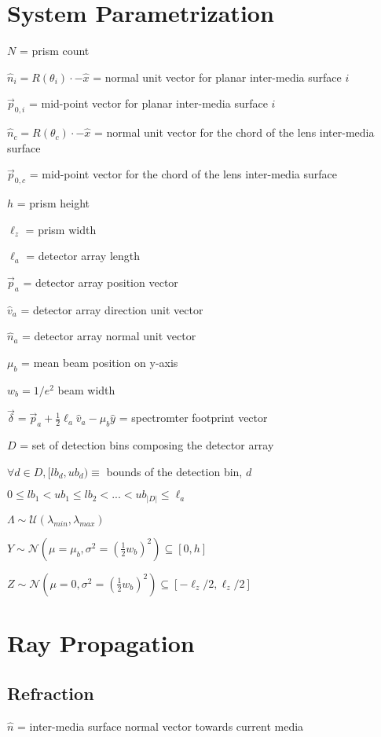 \documentclass{article}
\begin{document}
\section{System Parametrization}\label{sec:system-parametrization}
$N$ = prism count

$\hat{n}_i = R(\theta_i) \cdot -\hat{x}$ = normal unit vector for planar inter-media surface $i$

$\vec{p}_{0, i}$ = mid-point vector for planar inter-media surface $i$

$\hat{n}_c = R(\theta_c) \cdot -\hat{x}$ = normal unit vector for the chord of the lens inter-media surface

$\vec{p}_{0, c}$ = mid-point vector for the chord of the lens inter-media surface

$h$ = prism height

$\ell_z$  = prism width

$\ell_a$  = detector array length

$\vec{p}_a$ = detector array position vector

$\hat{v}_a$ = detector array direction unit vector

$\hat{n}_a$ = detector array normal unit vector

$\mu_b$ = mean beam position on y-axis

$w_b = 1 / e^2$ {beam width}

$\vec{\delta} = \vec{p}_a + \frac{1}{2} \ell_a \hat{v}_a - \mu_b \hat{y}$ = spectromter footprint vector

$D$ = set of detection bins composing the detector array

$\forall d \in D, [lb_d, ub_d) \equiv$ bounds of the detection bin, $d$

$0 \leq lb_1 < ub_1 \leq lb_2 < ... < ub_{|D|} \leq \ell_a $

$\Lambda \sim \mathcal{U}(\lambda_{min}, \lambda_{max}) $

$Y \sim \mathcal {N}(\mu=\mu_b, \sigma^2=(\frac{1}{2}w_b)^2) \subseteq [0, h] $

$Z \sim \mathcal {N}(\mu=0, \sigma^2=(\frac{1}{2}w_b)^2) \subseteq [-\ell_z / 2, \ell_z / 2]$


\section{Ray Propagation}\label{sec:ray-propagation}
\subsection{Refraction}\label{subsec:refraction}
$\hat{n}$ = inter-media surface normal vector towards current media
\end{document}
